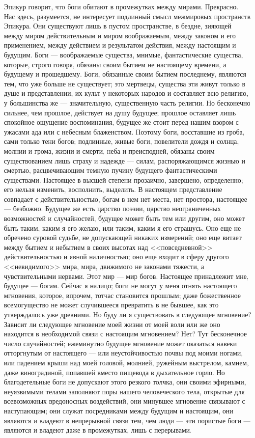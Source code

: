 \documentclass[12pt]{article}
\begin{document}
Эпикур говорит, что боги обитают в промежутках между мирами. Прекрасно. Нас здесь, разумеется, не интересует подлинный смысл межмировых пространств Эпикура. Они существуют лишь в пустом пространстве, в бездне, зияющей между миром действительным и миром воображаемым, между законом и его применением, между действием и результатом действия, между настоящим и будущим. Боги --- воображаемые существа, мнимые, фантастические существа, которые, строго говоря, обязаны своим бытием не настоящему времени, а будущему и прошедшему. Боги, обязанные своим бытием последнему, являются тем, что уже больше не существует; это мертвецы, существа эти живут только в душе и представлении, их культ у некоторых народов и составляет всю религию, у большинства же --- значительную, существенную часть религии. Но бесконечно сильнее, чем прошлое, действует на душу будущее; прошлое оставляет лишь спокойное ощущение воспоминания, будущее же стоит перед нашим взором с ужасами ада или с небесным блаженством. Поэтому боги, восставшие из гроба, сами только тени богов; подлинные, живые боги, повелители дождя и солнца, молнии и грома, жизни и смерти, неба и преисподней, обязаны своим существованием лишь страху и надежде --- силам, распоряжающимся жизнью и смертью, расцвечивающим темную пучину будущего фантастическими существами. Настоящее в высшей степени прозаично, завершено, определенно; его нельзя изменить, восполнить, выделить. В настоящем представление совпадает с действительностью, богам в нем нет места, нет простора, настоящее --- безбожно. Будущее же есть царство поэзии, царство неограниченных возможностей и случайностей, будущее может быть тем или другим, оно может быть таким, каким я его желаю, или таким, каким я его страшусь. Оно еще не обречено суровой судьбе, не допускающей никаких измерений; оно еще витает между бытием и небытием в своих высотах над <<повседневной>> действительностью и явной наличностью; оно еще входит в сферу другого <<невидимого>> мира, мира, движимого не законами тяжести, а чувствительными нервами. Этот мир --- мир богов. Настоящее принадлежит мне, будущее --- богам. Сейчас я налицо; боги не могут у меня отнять настоящего мгновения, которое, впрочем, тотчас становится прошлым; даже божественное всемогущество не может случившееся превратить в не бывшее, как это утверждалось уже древними. Но буду ли я существовать в следующее мгновение? Зависит ли следующее мгновение моей жизни от моей воли или же оно находится в необходимой связи с настоящим мгновением? Нет? Тут бесконечное число случайностей; ежеминутно будущее мгновение может оказаться навеки отторгнутым от настоящего --- или неустойчивостью почвы под моими ногами, или падением крыши над моей головой, молнией, ружейным выстрелом, камнем, даже виноградиной, попавшей вместо пищевода в дыхательное горло. Но благодетельные боги не допускают этого резкого толчка, они своими эфирными, неуязвимыми телами заполняют поры нашего человеческого тела, открытые для всевозможных вредоносных воздействий, они минувшее мгновение связывают с наступающим; они служат посредниками между будущим и настоящим, они являются и владеют в непрерывной связи тем, чем люди --- эти пористые боги --- являются и владеют даже в промежутках, лишь с перерывами.
\end{document}
